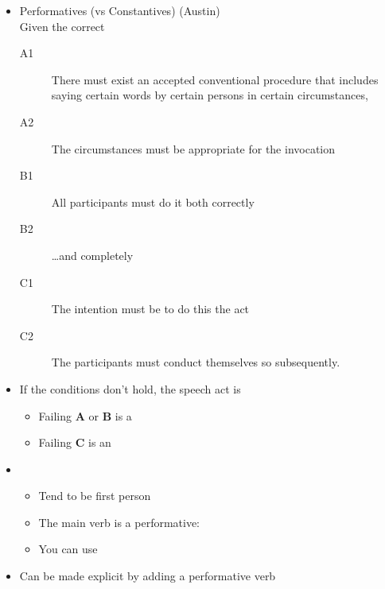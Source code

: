 \documentclass[headrule,footrule]{foils}
\begin{document}
\begin{itemize}
\item Performatives (vs Constantives) \hfill (Austin)
\\ Given the correct 
  \begin{description}
  \item[A1] There must exist an accepted conventional procedure that
    includes saying certain words by certain persons in certain
    circumstances,
  \item[A2] The circumstances must be appropriate for the invocation
  \item[B1] All participants must do it both correctly
  \item[B2] \ldots  and completely
  \item[C1] The intention must be to do this the act
  \item[C2] The participants must conduct themselves so subsequently.
  \end{description}
\item If the conditions don't hold, the speech act is 
  \begin{itemize}
  \item Failing \textbf{A} or \textbf{B} is a 
  \item Failing \textbf{C} is an 
  \end{itemize}
  \end{itemize}

\begin{itemize}
\item {}
  \begin{itemize}
  \item Tend to be first person
  \item The main verb  is a performative: 
  \item You can use 
  \end{itemize}
\item {}
  \begin{exe}
    \ex {}
    \ex {}
    \ex {}
    \ex {}
  \end{exe}
  Can be made explicit by adding a performative verb
\end{itemize}
\end{document}
